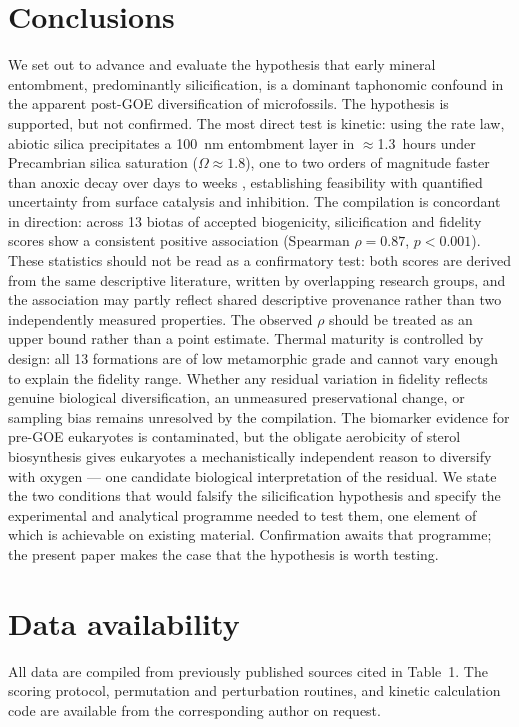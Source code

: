 \documentclass[11pt]{article}
\begin{document}
\section{Conclusions}

We set out to advance and evaluate the hypothesis that early mineral entombment, predominantly
silicification, is a dominant taphonomic confound in the apparent post-GOE diversification of
microfossils. The hypothesis is supported, but not confirmed. The most direct test is kinetic:
using the \citet{Rimstidt1980} rate law, abiotic silica precipitates a 100~nm entombment layer in
$\approx$1.3~hours under Precambrian silica saturation ($\Omega \approx 1.8$), one to two orders of
magnitude faster than anoxic decay over days to weeks \citep{TaxonRedox2025}, establishing feasibility with quantified uncertainty
from surface catalysis and inhibition. The compilation is concordant in direction: across 13 biotas
of accepted biogenicity, silicification and fidelity scores show a consistent positive association
(Spearman $\rho = 0.87$, $p < 0.001$). These statistics should not be read as a confirmatory test:
both scores are derived from the same descriptive literature, written by overlapping research groups,
and the association may partly reflect shared descriptive provenance rather than two independently
measured properties. The observed $\rho$ should be treated as an upper bound rather than a point
estimate. Thermal maturity is controlled by design: all 13 formations are of low metamorphic grade
and cannot vary enough to explain the fidelity range. Whether any residual variation in fidelity
reflects genuine biological diversification, an unmeasured preservational change, or sampling bias
remains unresolved by the compilation. The biomarker evidence for pre-GOE
eukaryotes is contaminated, but the obligate aerobicity of sterol biosynthesis gives eukaryotes a
mechanistically independent reason to diversify with oxygen --- one candidate biological interpretation
of the residual. We state the two conditions that would falsify the silicification hypothesis and
specify the experimental and analytical programme needed to test them, one element of which is
achievable on existing material. Confirmation awaits that programme; the present paper makes the case
that the hypothesis is worth testing.

\section*{Data availability}
All data are compiled from previously published sources cited in Table~1. The scoring protocol,
permutation and perturbation routines, and kinetic calculation code are available from the
corresponding author on request.
\end{document}
